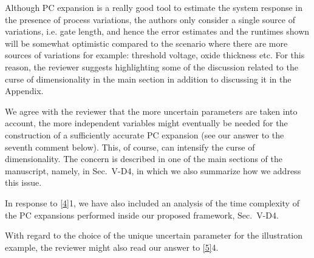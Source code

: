 \begin{reviewer}
Although PC expansion is a really good tool to estimate the system response in the presence of process variations, the authors only consider a single source of variations, i.e. gate length, and hence the error estimates and the runtimes shown will be somewhat optimistic compared to the scenario where there are more sources of variations for example: threshold voltage, oxide thickness etc. For this reason, the reviewer suggests highlighting some of the discussion related to the curse of dimensionality in the main section in addition to discussing it in the Appendix.
\end{reviewer}
\begin{authors}
We agree with the reviewer that the more uncertain parameters are taken into account, the more independent variables might eventually be needed for the construction of a sufficiently accurate PC expansion (see our answer to the seventh comment below).
This, of course, can intensify the curse of dimensionality.
The concern is described in one of the main sections of the manuscript, namely, in Sec.~V-D4, in which we also summarize how we address this issue.

In response to \cref{4}{1}, we have also included an analysis of the time complexity of the PC expansions performed inside our proposed framework, Sec.~V-D4.

With regard to the choice of the unique uncertain parameter for the illustration example, the reviewer might also read our answer to \cref{5}{4}.

\begin{actions}
\end{actions}
\end{authors}

